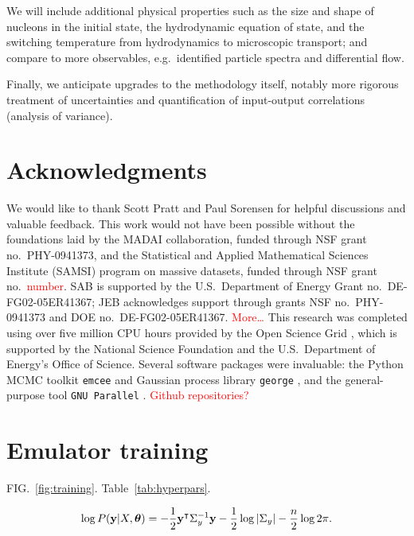 \documentclass[aps,prc,reprint,superscriptaddress,amsmath]{revtex4-1}
\newcommand{\todo}[1]{\textcolor{red}{#1}}
\newcommand{\tran}{^\intercal}
\begin{document}
We will include additional physical properties such as the size and shape of nucleons in the initial state, the hydrodynamic equation of state, and the switching temperature from hydrodynamics to microscopic transport; and compare to more observables, e.g.\ identified particle spectra and differential flow.

Finally, we anticipate upgrades to the methodology itself, notably more rigorous treatment of uncertainties and quantification of input-output correlations (analysis of variance).


\section*{Acknowledgments}

We would like to thank Scott Pratt and Paul Sorensen for helpful discussions and valuable feedback.
This work would not have been possible without the foundations laid by the MADAI collaboration, funded through NSF grant no.~PHY-0941373, and the Statistical and Applied Mathematical Sciences Institute (SAMSI) program on massive datasets, funded through NSF grant no.~\todo{number}.
SAB is supported by the U.S.\ Department of Energy Grant no.~DE-FG02-05ER41367; JEB acknowledges support through grants NSF no.~PHY-0941373 and DOE no.~DE-FG02-05ER41367.
\todo{More\ldots}
This research was completed using over five million CPU hours provided by the Open Science Grid \cite{Pordes:2007zzb,Sfiligoi:2010zz}, which is supported by the National Science Foundation and the U.S.\ Department of Energy's Office of Science.
Several software packages were invaluable:
the Python MCMC toolkit \texttt{emcee} \cite{FM:2013mc} and Gaussian process library \texttt{george} \cite{Ambikasaran:2014gp}, and the general-purpose tool \texttt{GNU Parallel} \cite{Tange:2011pa}.
\todo{Github repositories?}


\appendix

\section{\label{app:train}Emulator training}

\newcommand{\vectheta}{\boldsymbol\theta}

FIG.~\ref{fig:training}.
Table~\ref{tab:hyperpars}.

\begin{equation}
  \log P(\y|X,\vectheta) = -\frac{1}{2} \y\tran \Sigma_y^{-1} \y - \frac{1}{2} \log |\Sigma_y| - \frac{n}{2} \log 2\pi.
\end{equation}
\end{document}
